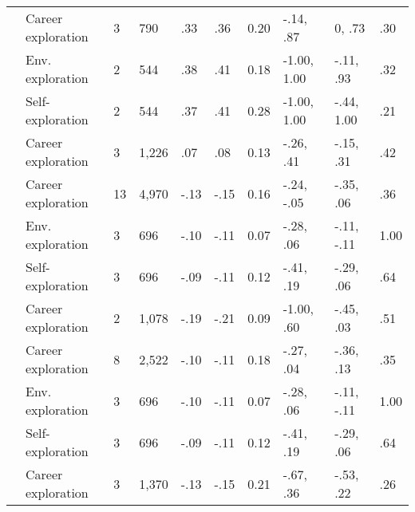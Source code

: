 \begin{table}[ht]
\begin{tabular}{llllllllll}
   & Career exploration & 3 & 790 & .33 & .36 & 0.20 & -.14, .87 & 0, .73 & .30 \\ 
   & \hspace{0.8em}Env. exploration & 2 & 544 & .38 & .41 & 0.18 & -1.00, 1.00 & -.11, .93 & .32 \\ 
   & \hspace{0.8em}Self-exploration & 2 & 544 & .37 & .41 & 0.28 & -1.00, 1.00 & -.44, 1.00 & .21 \\ 
   & Career exploration & 3 & 1,226 & .07 & .08 & 0.13 & -.26, .41 & -.15, .31 & .42 \\ 
   & Career exploration & 13 & 4,970 & -.13 & -.15 & 0.16 & -.24, -.05 & -.35, .06 & .36 \\ 
   & \hspace{0.8em}Env. exploration & 3 & 696 & -.10 & -.11 & 0.07 & -.28, .06 & -.11, -.11 & 1.00 \\ 
   & \hspace{0.8em}Self-exploration & 3 & 696 & -.09 & -.11 & 0.12 & -.41, .19 & -.29, .06 & .64 \\ 
   & Career exploration & 2 & 1,078 & -.19 & -.21 & 0.09 & -1.00, .60 & -.45, .03 & .51 \\ 
   & Career exploration & 8 & 2,522 & -.10 & -.11 & 0.18 & -.27, .04 & -.36, .13 & .35 \\ 
   & \hspace{0.8em}Env. exploration & 3 & 696 & -.10 & -.11 & 0.07 & -.28, .06 & -.11, -.11 & 1.00 \\ 
   & \hspace{0.8em}Self-exploration & 3 & 696 & -.09 & -.11 & 0.12 & -.41, .19 & -.29, .06 & .64 \\ 
   & Career exploration & 3 & 1,370 & -.13 & -.15 & 0.21 & -.67, .36 & -.53, .22 & .26 \\ 
   \hline
\end{tabular}
\end{table}
